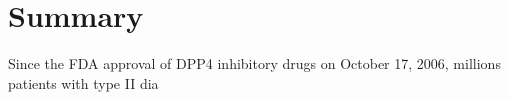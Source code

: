 \section{\label{chap:Sum} Summary}
Since the FDA approval of DPP4 inhibitory drugs on October 17, 2006, millions patients with type II dia
